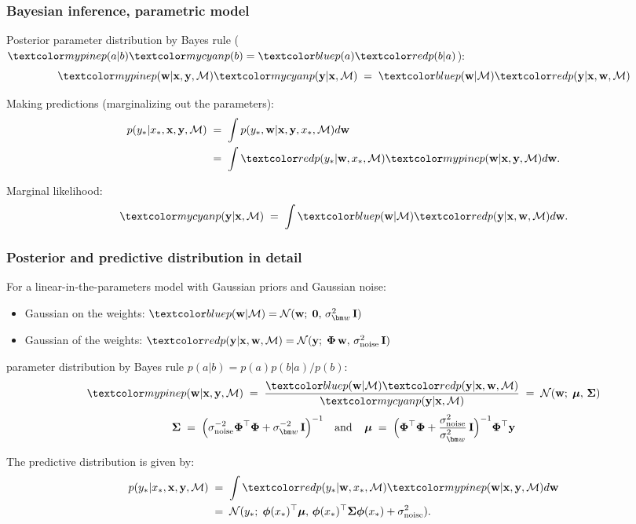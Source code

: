 \begin{frame}
\frametitle{Bayesian inference, parametric model}

Posterior parameter distribution by Bayes rule ($\Green{p(a|b)}\Cyan{p(b)}=\Blue{p(a)} \Red{p(b|a)}$):
\[
\Green{p(\bfw|\bfx,\bfy,\mathcal{M})}\Cyan{p(\bfy|\bfx,\mathcal{M})}
\;=\;\Blue{p(\bfw|\mathcal{M})}\Red{p(\bfy|\bfx,\bfw,\mathcal{M})}
\]

Making predictions (marginalizing out the parameters):
\[
\begin{split}
p(y_*|x_*,\bfx, \bfy,\mathcal{M})\;&=\;
\int p(y_*,\bfw|\bfx, \bfy, x_*, \mathcal{M})d\bfw\\
&=\;\int \Red{p(y_*|\bfw,x_*,\mathcal{M})}\Green{p(\bfw|\bfx,\bfy,\mathcal{M})}d\bfw.
\end{split}
\]

Marginal likelihood:
\[
\Cyan{p(\bfy|\bfx,\mathcal{M})}\;=\;
\int \Blue{p(\bfw|\mathcal{M})}  \Red{p(\bfy|\bfx,\bfw,\mathcal{M})}  d\bfw.
\]
\end{frame}


\begin{frame}
\frametitle{Posterior and predictive distribution in detail}

For a linear-in-the-parameters model with Gaussian priors and Gaussian noise:
\begin{itemize}
\item Gaussian  on the weights: 
$\Blue{p(\bfw|\mathcal{M})}=\N(\bfw;\;\mathbf{0},\,\sigma_{\bm w}^2\,\bfI)$
\item Gaussian  of the weights:
$\Red{p(\bfy|\bfx,\bfw,\mathcal{M}})=\N(\bfy;\;\bPhi\,\bfw,\,\sigma_\mathrm{noise}^2\,\bfI)$
\end{itemize}

 parameter distribution by Bayes rule $p(a|b)=p(a)p(b|a)/p(b)$:
\[
\Green{p(\bfw|\bfx,\bfy,\mathcal{M})}\;=\;\frac{\Blue{p(\bfw|\mathcal{M})}
\Red{p(\bfy|\bfx,\bfw,\mathcal{M})}}{\Cyan{p(\bfy|\bfx,\mathcal{M})}}
\;=\; \N(\bfw;\;\bmu,\,\bSigma)
\]
\[
\bSigma\;=\;\left(\sigma_\mathrm{noise}^{-2}\bPhi^\top\bPhi+\sigma_{\bm
    w}^{-2}\,\bfI\right)^{-1}
\mathrm{\; \; \; and \; \; \; \; }
\bmu\;=\;
\Big(\bPhi^\top\bPhi+\frac{\sigma_\mathrm{noise}^2}{\sigma_{\bm w}^2}\,\bfI\Big)^{-1}\bPhi^\top\bfy
\]

The predictive distribution is given by:
\[
\begin{split}
p(y_*|x_*,\bfx, \bfy,\mathcal{M})\;&=\;\int
\Red{p(y_*|\bfw,x_*,\mathcal{M})}\Green{p(\bfw|\bfx, \bfy,\mathcal{M})}d\bfw\\
&=\;\N(y_*;\; \bphi(x_*)^\top\bmu,\,\bphi(x_*)^\top\bSigma\bphi(x_*)+\sigma_\mathrm{noise}^2).
\end{split}
\]
\end{frame}


